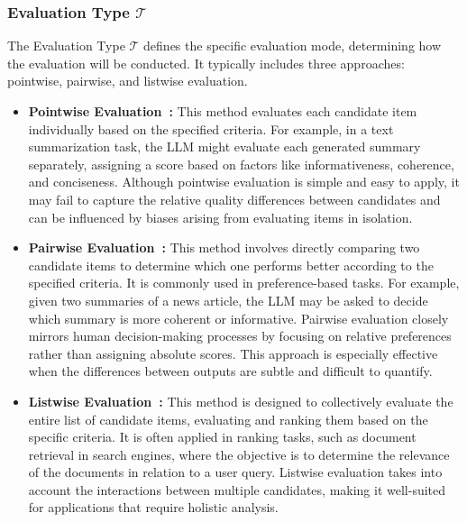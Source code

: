 \subsubsection{Evaluation Type $\mathcal{T}$}
The Evaluation Type $\mathcal{T}$ defines the specific evaluation mode, determining how the evaluation will be conducted. It typically includes three approaches: pointwise, pairwise, and listwise evaluation.

\begin{itemize}[leftmargin=*]
\item \textbf{Pointwise Evaluation~\cite{wang2023learning,kim2023prometheus,ye2024self}:} This method evaluates each candidate item individually based on the specified criteria.
For example, in a text summarization task, the LLM might evaluate each generated summary separately, assigning a score based on factors like informativeness, coherence, and conciseness. Although pointwise evaluation is simple and easy to apply, it may fail to capture the relative quality differences between candidates and can be influenced by biases arising from evaluating items in isolation.


\item \textbf{Pairwise Evaluation~\cite{saad2023ares,cao2024compassjudger,he2024fedeval,hu2024rethinking}:} This method involves directly comparing two candidate items to determine which one performs better according to the specified criteria. It is commonly used in preference-based tasks. For example, given two summaries of a news article, the LLM may be asked to decide which summary is more coherent or informative. Pairwise evaluation closely mirrors human decision-making processes by focusing on relative preferences rather than assigning absolute scores. This approach is especially effective when the differences between outputs are subtle and difficult to quantify.


\item \textbf{Listwise Evaluation~\cite{10.1145/3626772.3657813,yan-etal-2024-consolidating,hou2024large,niu2024judgerank}:} 
This method is designed to collectively evaluate the entire list of candidate items, evaluating and ranking them based on the specific criteria. It is often applied in ranking tasks, such as document retrieval in search engines, where the objective is to determine the relevance of the documents in relation to a user query. Listwise evaluation takes into account the interactions between multiple candidates, making it well-suited for applications that require holistic analysis. 
\end{itemize}

